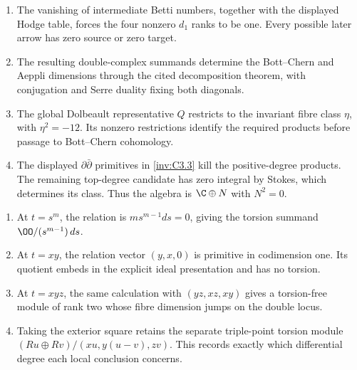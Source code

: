 \RungOne
\begin{enumerate}[label=\arabic*.]
\item The vanishing of intermediate Betti numbers, together
with the displayed Hodge table, forces the four nonzero
$d_1$ ranks to be one. Every possible later arrow has zero
source or zero target.
\item The resulting double-complex summands determine the
Bott--Chern and Aeppli dimensions through the cited
decomposition theorem, with conjugation and Serre duality
fixing both diagonals.
\item The global Dolbeault representative $Q$ restricts to
the invariant fibre class $\eta$, with $\eta^2=-12$.
Its nonzero restrictions identify the required products
before passage to Bott--Chern cohomology.
\item The displayed $\partial\bar\partial$ primitives in
\ref{inv:C3.3} kill the positive-degree products. The
remaining top-degree candidate has zero integral by Stokes,
which determines its class. Thus the algebra is $\C\oplus N$
with $N^2=0$.
\end{enumerate}

\RungOne
\begin{enumerate}[label=\arabic*.]
\item At $t=s^m$, the relation is $ms^{m-1}ds=0$,
giving the torsion summand $\OO/(s^{m-1})\,ds$.
\item At $t=xy$, the relation vector $(y,x,0)$ is
primitive in codimension one. Its quotient embeds in the
explicit ideal presentation and has no torsion.
\item At $t=xyz$, the same calculation with
$(yz,xz,xy)$ gives a torsion-free module of rank two
whose fibre dimension jumps on the double locus.
\item Taking the exterior square retains the separate
triple-point torsion module
$(Ru\oplus Rv)/(xu,y(u-v),zv)$. This records exactly
which differential degree each local conclusion concerns.
\end{enumerate}

